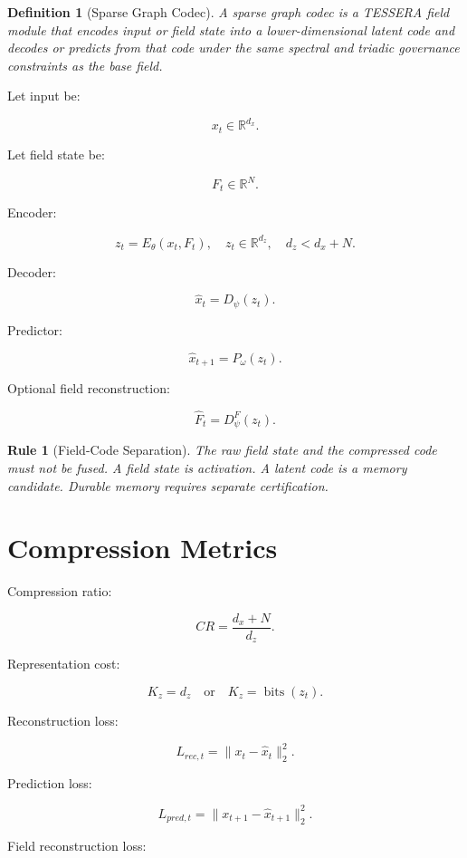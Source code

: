 \documentclass[12pt]{article}
\newtheorem{definition}{Definition}
\newtheorem{rulebox}{Rule}
\begin{document}
\begin{definition}[Sparse Graph Codec]
A sparse graph codec is a TESSERA field module that encodes input or field
state into a lower-dimensional latent code and decodes or predicts from that
code under the same spectral and triadic governance constraints as the base
field.
\end{definition}

Let input be:

\[
x_t\in\mathbb{R}^{d_x}.
\]

Let field state be:

\[
F_t\in\mathbb{R}^{N}.
\]

Encoder:

\[
\boxed{
z_t=E_{\theta}(x_t,F_t),\quad z_t\in\mathbb{R}^{d_z},\quad d_z<d_x+N.
}
\]

Decoder:

\[
\hat{x}_t=D_{\psi}(z_t).
\]

Predictor:

\[
\hat{x}_{t+1}=P_{\omega}(z_t).
\]

Optional field reconstruction:

\[
\hat{F}_t=D^F_{\psi}(z_t).
\]

\begin{rulebox}[Field-Code Separation]
The raw field state and the compressed code must not be fused. A field state is
activation. A latent code is a memory candidate. Durable memory requires
separate certification.
\end{rulebox}

\section{Compression Metrics}

Compression ratio:

\[
\boxed{
CR=\frac{d_x+N}{d_z}.
}
\]

Representation cost:

\[
K_z=d_z \quad \text{or} \quad K_z=\operatorname{bits}(z_t).
\]

Reconstruction loss:

\[
\boxed{
L_{rec,t}=\|x_t-\hat{x}_t\|_2^2.
}
\]

Prediction loss:

\[
\boxed{
L_{pred,t}=\|x_{t+1}-\hat{x}_{t+1}\|_2^2.
}
\]

Field reconstruction loss:
\end{document}
